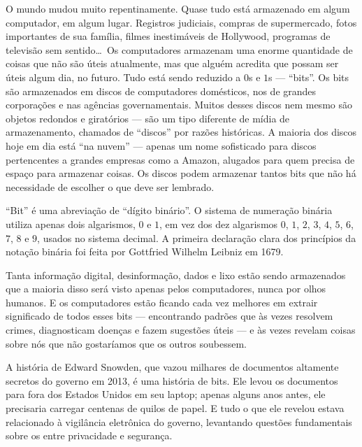 O mundo mudou muito repentinamente. Quase tudo está armazenado em algum 
computador, em algum lugar. Registros judiciais, compras de supermercado,
fotos importantes de sua família, filmes inestimáveis de Hollywood, programas de
televisão sem sentido\ldots\ Os computadores armazenam uma enorme quantidade de
coisas que não são úteis atualmente, mas que alguém acredita que possam ser
úteis algum dia, no futuro. Tudo está sendo reduzido a $0$s e $1$s ---
``bits''. Os bits são armazenados em discos de computadores domésticos, nos
 de grandes corporações e nas agências
governamentais. Muitos desses discos nem mesmo são
objetos redondos e 
giratórios --- são um tipo diferente de mídia de armazenamento, chamados de
``discos'' por razões históricas. A maioria dos discos hoje em dia está ``na
nuvem'' --- apenas um nome sofisticado para discos pertencentes a grandes 
empresas como a Amazon, alugados para quem precisa de espaço para armazenar 
coisas. Os discos podem armazenar tantos bits que não há necessidade de escolher
o que deve ser lembrado.

\begin{tcolorbox}
``Bit'' é uma abreviação de ``dígito binário''. O sistema de numeração binária
utiliza apenas dois algarismos, $0$ e $1$, em vez dos dez algarismos $0$, $1$,
$2$, $3$, $4$, $5$, $6$, $7$, $8$ e $9$, usados no sistema decimal. A primeira
declaração clara dos princípios da notação binária foi feita por Gottfried
Wilhelm Leibniz em 1679.%
\end{tcolorbox}

Tanta informação digital, desinformação, dados e lixo estão sendo armazenados 
que a maioria disso será visto apenas pelos computadores, nunca por olhos
humanos. E os computadores estão ficando cada vez melhores em extrair 
significado de todos esses bits --- encontrando padrões que às vezes resolvem
crimes, diagnosticam doenças e fazem sugestões úteis --- e às vezes revelam
coisas sobre nós que não gostaríamos que os outros soubessem.

A história de Edward Snowden, que vazou milhares de documentos altamente
secretos do governo em 2013, é uma história de bits. Ele levou os documentos 
para fora dos Estados Unidos em seu laptop; apenas alguns anos antes, ele
precisaria carregar centenas de quilos de papel. E tudo o que ele revelou estava
relacionado à vigilância eletrônica do governo, levantando questões fundamentais
sobre os  entre privacidade e segurança.

